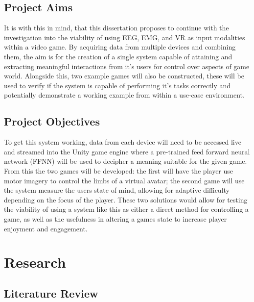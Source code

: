 \documentclass[11pt, a4paper]{article}
\begin{document}
\subsection{Project Aims}

It is with this in mind, that this dissertation proposes to continue with the investigation into the viability of using EEG, EMG, and VR as input modalities within a video game. By acquiring data from multiple devices and combining them, the aim is for the creation of a single system capable of attaining and extracting meaningful interactions from it's users for control over aspects of game world. Alongside this, two example games will also be constructed, these will be used to verify if the system is capable of performing it's tasks correctly and potentially demonstrate a working example from within a use-case environment.

\pagebreak
\subsection{Project Objectives}

To get this system working, data from each device will need to be accessed live and streamed into the Unity game engine where a pre-trained feed forward neural network (FFNN) will be used to decipher a meaning suitable for the given game. From this the two games will be developed: the first will have the player use motor imagery to control the limbs of a virtual avatar; the second game will use the system measure the users state of mind, allowing for adaptive difficulty depending on the focus of the player. These two solutions would allow for testing the viability of using a system like this as either a direct method for controlling a game, as well as the usefulness in altering a games state to increase player enjoyment and engagement.

\pagebreak
\section{Research}	
\subsection{Literature Review}	%
\end{document}
